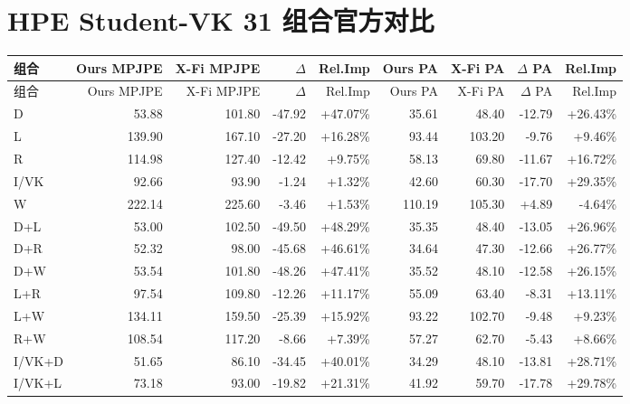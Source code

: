 \documentclass[UTF8,10pt,a4paper]{ctexart}
\newcommand{\better}[1]{\textcolor{ImpBlue}{#1}}
\newcommand{\worse}[1]{\textcolor{DropRed}{#1}}
\begin{document}
\appendix
\section{HPE Student-VK 31 组合官方对比}
{\tiny
\begin{longtable}{lrrrrrrrr}
\toprule
组合 & Ours MPJPE & X-Fi MPJPE & $\Delta$ & Rel.Imp & Ours PA & X-Fi PA & $\Delta$ PA & Rel.Imp\\
\midrule
\endfirsthead
\toprule
组合 & Ours MPJPE & X-Fi MPJPE & $\Delta$ & Rel.Imp & Ours PA & X-Fi PA & $\Delta$ PA & Rel.Imp\\
\midrule
\endhead
D & 53.88 & 101.80 & \better{-47.92} & \better{+47.07\%} & 35.61 & 48.40 & \better{-12.79} & \better{+26.43\%}\\
L & 139.90 & 167.10 & \better{-27.20} & \better{+16.28\%} & 93.44 & 103.20 & \better{-9.76} & \better{+9.46\%}\\
R & 114.98 & 127.40 & \better{-12.42} & \better{+9.75\%} & 58.13 & 69.80 & \better{-11.67} & \better{+16.72\%}\\
I/VK & 92.66 & 93.90 & \better{-1.24} & \better{+1.32\%} & 42.60 & 60.30 & \better{-17.70} & \better{+29.35\%}\\
W & 222.14 & 225.60 & \better{-3.46} & \better{+1.53\%} & 110.19 & 105.30 & \worse{+4.89} & \worse{-4.64\%}\\
D+L & 53.00 & 102.50 & \better{-49.50} & \better{+48.29\%} & 35.35 & 48.40 & \better{-13.05} & \better{+26.96\%}\\
D+R & 52.32 & 98.00 & \better{-45.68} & \better{+46.61\%} & 34.64 & 47.30 & \better{-12.66} & \better{+26.77\%}\\
D+W & 53.54 & 101.80 & \better{-48.26} & \better{+47.41\%} & 35.52 & 48.10 & \better{-12.58} & \better{+26.15\%}\\
L+R & 97.54 & 109.80 & \better{-12.26} & \better{+11.17\%} & 55.09 & 63.40 & \better{-8.31} & \better{+13.11\%}\\
L+W & 134.11 & 159.50 & \better{-25.39} & \better{+15.92\%} & 93.22 & 102.70 & \better{-9.48} & \better{+9.23\%}\\
R+W & 108.54 & 117.20 & \better{-8.66} & \better{+7.39\%} & 57.27 & 62.70 & \better{-5.43} & \better{+8.66\%}\\
I/VK+D & 51.65 & 86.10 & \better{-34.45} & \better{+40.01\%} & 34.29 & 48.10 & \better{-13.81} & \better{+28.71\%}\\
I/VK+L & 73.18 & 93.00 & \better{-19.82} & \better{+21.31\%} & 41.92 & 59.70 & \better{-17.78} & \better{+29.78\%}\\

\end{longtable}}
\end{document}

